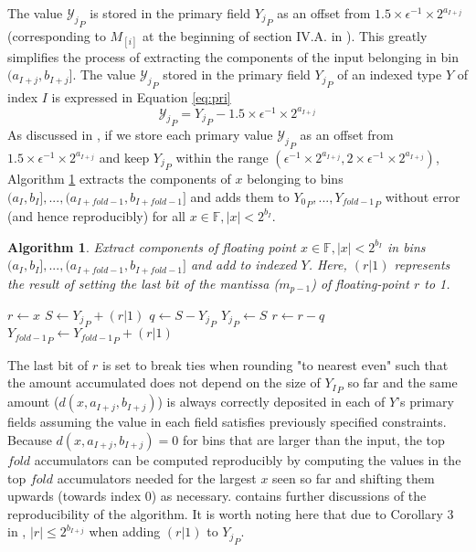 \documentclass[12pt]{article}
\providecommand{\F}{\ensuremath{\mathbb{F}}}
\theoremstyle{plain}
\newtheorem{alg}{Algorithm}[section]
\begin{document}
      The value ${\mathcal{Y}_j}_P$ is stored in the primary field ${Y_j}_P$ as an offset from $1.5\times \epsilon^{-1} \times 2^{a_{I + j}}$ (corresponding to $M_{[i]}$ at the beginning of section IV.A. in \cite{repsum}). This greatly simplifies the process of extracting the components of the input belonging in bin $(a_{I + j}, b_{I + j}]$.
      The value ${\mathcal{Y}_j}_P$ stored in the primary field ${Y_j}_P$ of an indexed type $Y$ of index $I$ is expressed in Equation \ref{eq:pri}
      \begin{equation}
        {\mathcal{Y}_j}_P = {Y_j}_P - 1.5\times\epsilon^{-1}\times2^{a_{I + j}}
        \label{eq:pri}
      \end{equation}
      As discussed in \cite{repsum}, if we store each primary value ${\mathcal{Y}_j}_P$ as an offset from $1.5 \times \epsilon^{-1} \times 2^{a_{I + j}}$ and keep ${Y_j}_P$ within the range $(\epsilon^{-1} \times 2^{a_{I + j}}, 2 \times \epsilon^{-1} \times 2^{a_{I + j}})$, Algorithm \ref{alg:deposit} extracts the components of $x$ belonging to bins $(a_I, b_I], ..., (a_{I + fold - 1}, b_{I + fold - 1}]$ and adds them to ${Y_0}_P, ..., {Y_{fold - 1}}_P$ without error (and hence reproducibly) for all $x \in \F, |x| < 2^{b_I}$.
      \begin{alg}
        Extract components of floating point $x \in \F, |x| < 2^{b_I}$ in bins $(a_I, b_I], ..., (a_{I + fold - 1}, b_{I + fold - 1}]$ and add to indexed $Y$. Here, $(r | 1)$ represents the result of setting the last bit of the mantissa ($m_{p - 1}$) of floating-point $r$ to 1.
        \begin{algorithmic}
            \State $r \gets x$
              \State $S \gets {Y_j}_P + (r | 1)$
              \State $q \gets S - {Y_j}_P$
              \State ${Y_j}_P \gets S$
              \State $r \gets r - q$
            \EndFor
            \State ${Y_{fold - 1}}_P \gets {Y_{fold - 1}}_P + (r | 1)$
          \EndFunction
        \end{algorithmic}
        \label{alg:deposit}
      \end{alg}
      The last bit of $r$ is set to break ties when rounding "to nearest even" such that the amount accumulated does not depend on the size of ${Y_I}_P$ so far and the same amount ($d(x, a_{I + j}, b_{I + j})$) is always correctly deposited in each of $Y$'s primary fields assuming the value in each field satisfies previously specified constraints. Because $d(x, a_{I + j}, b_{I + j}) = 0$ for bins that are larger than the input, the top $fold$ accumulators can be computed reproducibly by computing the values in the top $fold$ accumulators needed for the largest $x$ seen so far and shifting them upwards (towards index $0$) as necessary. \cite{repsum} contains further discussions of the reproducibility of the algorithm.
      It is worth noting here that due to Corollary $3$ in \cite{repsum}, $|r| \leq 2^{b_{I + j}}$ when adding $(r | 1)$ to ${Y_j}_P$.
\end{document}
